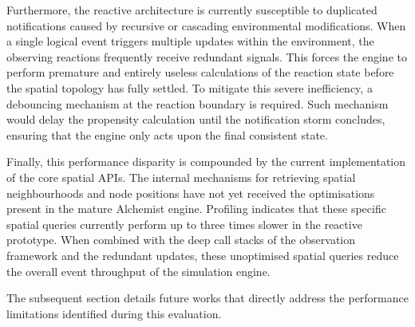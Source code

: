 Furthermore, the reactive architecture is currently susceptible to duplicated
notifications caused by recursive or cascading environmental modifications.
When a single logical event triggers multiple updates within the environment,
the observing reactions frequently receive redundant signals. This forces the
engine to perform premature and entirely useless calculations of the reaction
state before the spatial topology has fully settled. To mitigate this severe
inefficiency, a debouncing mechanism at the reaction boundary is required. Such
mechanism would delay the propensity calculation until the notification storm
concludes, ensuring that the engine only acts upon the final consistent state.

Finally, this performance disparity is compounded by the current implementation
of the core spatial \ac{API}s. The internal mechanisms for retrieving spatial
neighbourhoods and node positions have not yet received the optimisations
present in the mature Alchemist engine. Profiling indicates that these specific
spatial queries currently perform up to three times slower in the reactive
prototype. When combined with the deep call stacks of the observation framework
and the redundant updates, these unoptimised spatial queries reduce the overall
event throughput of the simulation engine.

The subsequent section details future works that directly address the
performance limitations identified during this evaluation.

